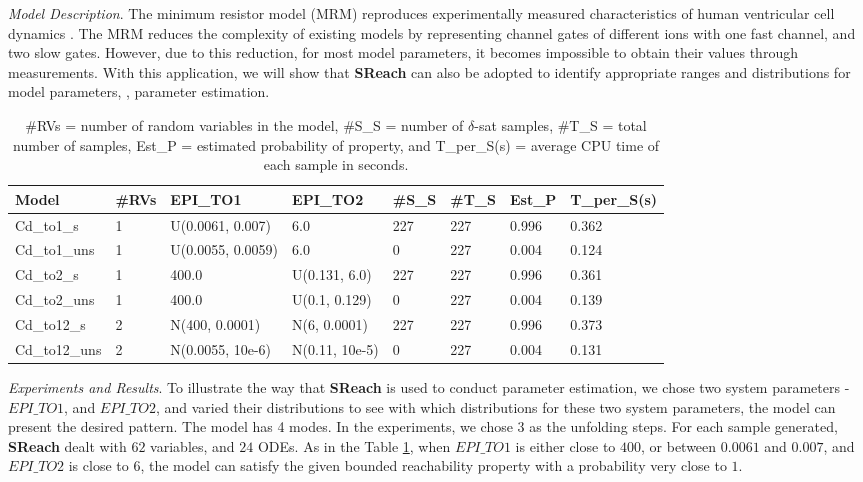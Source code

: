 \textit{Model Description}.
The minimum resistor model (MRM) reproduces experimentally measured characteristics 
of human ventricular cell dynamics \cite{bueno2008minimal}. 
The MRM reduces the complexity of existing models by representing channel gates of different ions with one fast channel, and two slow gates. However, due to this reduction, for most model parameters, it becomes impossible to obtain their values through measurements. With this application, we will show that {\bf SReach} can also be adopted to identify appropriate ranges and distributions for model parameters, \ie, parameter estimation.
\begin{table}[h]
\centering
    \begin{tabular}{|l|l|l|l|l|l|l|l|}
    \hline
    Model         & \#RVs & EPI\_TO1            & EPI\_TO2         & \#S\_S & \#T\_S & Est\_P & T\_per\_S(s) \\ \hline
    Cd\_to1\_s    & 1     & U(0.0061, 0.007)    & 6.0              & 227       & 227      & 0.996     & 0.362        \\ \hline
    Cd\_to1\_uns  & 1     & U(0.0055, 0.0059)   & 6.0              & 0         & 227      & 0.004     & 0.124        \\ \hline
    Cd\_to2\_s    & 1     & 400.0               & U(0.131, 6.0)    & 227       & 227      & 0.996     & 0.361        \\ \hline
    Cd\_to2\_uns  & 1     & 400.0               & U(0.1, 0.129)    & 0         & 227      & 0.004     & 0.139        \\ \hline
    Cd\_to12\_s   & 2     & N(400, 0.0001)      & N(6, 0.0001)     & 227       & 227      & 0.996     & 0.373        \\ \hline
    Cd\_to12\_uns & 2     & N(0.0055, 10e-6) & N(0.11, 10e-5) & 0         & 227      & 0.004     & 0.131        \\ \hline
    \end{tabular}
    \caption { \#RVs = number of random variables in the model, \#S\_S = number of $\delta$-sat samples, 
\#T\_S = total number of samples, Est\_P = estimated probability of property, and T\_per\_S(s) = average 
CPU time of each sample in seconds.}
    \label{table:cardiac}
\end{table}

\textit{Experiments and Results}. To illustrate the way that {\bf SReach} is used to conduct parameter estimation, we chose two system parameters - $EPI\_TO1$, and $EPI\_TO2$, and varied their distributions to see with which distributions for these two system parameters, the model can present the desired pattern. The model has 4 modes. In the experiments, we chose $3$ as the unfolding steps. For each sample generated, {\bf SReach} dealt with $62$ variables, and $24$ ODEs. As in the Table \ref{table:cardiac}, when $EPI\_TO1$ is either close to $400$, or between $0.0061$ and $0.007$, and $EPI\_TO2$ is close to $6$, the model can satisfy the given bounded reachability property with a probability very close to $1$. 

